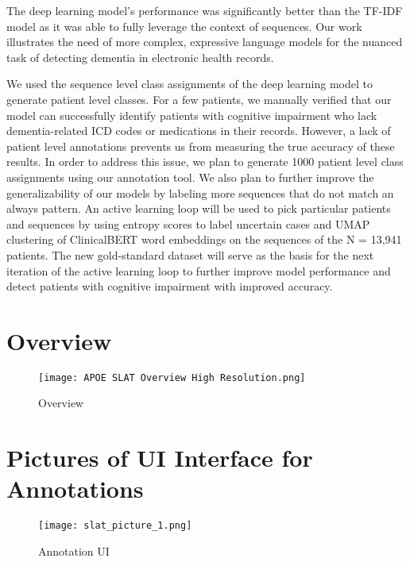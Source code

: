 \documentclass[pmlr,twocolumn,10pt]{jmlr} %
\begin{document}
The deep learning model's performance was significantly better than the TF-IDF model as it was able to fully leverage the context of sequences. Our work illustrates the need of more complex, expressive language models for the nuanced task of detecting dementia in electronic health records.

We used the sequence level class assignments of the deep learning model to generate patient level classes. For a few patients, we manually verified that our model can successfully identify patients with cognitive impairment who lack dementia-related ICD codes or medications in their records. However, a lack of patient level annotations prevents us from measuring the true accuracy of these results. In order to address this issue, we plan to generate 1000 patient level class assignments using our annotation tool. We also plan to further improve the generalizability of our models by labeling more sequences that do not match an always pattern. An active learning loop will be used to pick particular patients and sequences by using entropy scores to label uncertain cases and UMAP clustering \citep{mcinnes2018umap} of ClinicalBERT word embeddings on the sequences of the N = 13,941 patients. The new gold-standard dataset will serve as the basis for the next iteration of the active learning loop to further improve model performance and detect patients with cognitive impairment with improved accuracy.

\clearpage



\nocite{*}

\clearpage

\appendix

\section{Overview}
\begin{figure}[h] \label{app:overview}
\centering 
\texttt{[image: APOE SLAT Overview High Resolution.png]}
\caption{Overview}

\end{figure}

\clearpage

\section{Pictures of UI Interface for Annotations} 
\label{app:slat}
\begin{figure}[h]
\centering 
\texttt{[image: slat\_picture\_1.png]}
\caption{Annotation UI}
\end{figure}
\end{document}
